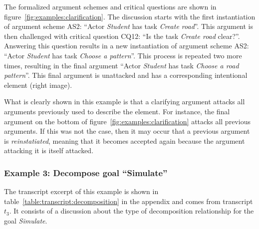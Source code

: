 The formalized argument schemes and critical questions are shown in figure~\ref{fig:examples:clarification}. The discussion starts with the first instantiation of argument scheme AS2: ``Actor \emph{Student} has task \emph{Create road}''. This argument is then challenged with critical question CQ12: ``Is the task \emph{Create road} clear?''. Answering this question results in a new instantiation of argument scheme AS2: ``Actor \emph{Student} has task \emph{Choose a pattern}''. This process is repeated two more times, resulting in the final argument ``Actor \emph{Student} has task \emph{Choose a road pattern}''. This final argument is unattacked and has a corresponding intentional element (right image). 

What is clearly shown in this example is that a clarifying argument attacks all arguments previously used to describe the element. For instance, the final argument on the bottom of figure~\ref{fig:examples:clarification} attacks all previous arguments. If this was not the case, then it may occur that a previous argument is \emph{reinstatiated}, meaning that it becomes accepted again because the argument attacking it is itself attacked.

\subsubsection{Example 3: Decompose goal ``Simulate''}

The transcript excerpt of this example is shown in table~\ref{table:transcript:decomposition} in the appendix and comes from transcript $t_3$. It consists of a discussion about the type of decomposition relationship for the goal \emph{Simulate}.

